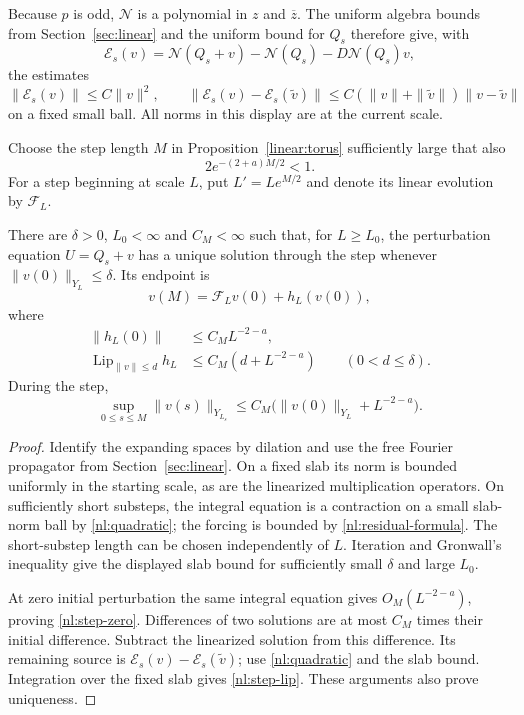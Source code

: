 Because $p$ is odd, $\mathcal N$ is a polynomial in $z$ and $\overline z$.
The uniform algebra bounds from Section~\ref{sec:linear} and the uniform
bound for $Q_s$ therefore give, with
\[
 \mathcal E_s(v)=\mathcal N(Q_s+v)-\mathcal N(Q_s)
                    -D\mathcal N(Q_s)v,
\]
the estimates
\begin{equation}\label{nl:quadratic}
 \|\mathcal E_s(v)\|\leq C\|v\|^2,
 \qquad
 \|\mathcal E_s(v)-\mathcal E_s(\widetilde v)\|
 \leq C(\|v\|+\|\widetilde v\|)\|v-\widetilde v\|
\end{equation}
on a fixed small ball. All norms in this display are at the current scale.

Choose the step length $M$ in Proposition~\ref{linear:torus} sufficiently
large that also
\begin{equation}\label{nl:step-condition}
 2e^{-(2+a)M/2}<1.
\end{equation}
For a step beginning at scale $L$, put $L'=Le^{M/2}$ and denote its linear
evolution by $\mathcal F_L$.

\begin{lemma}\label{nl:step}
There are $\delta>0$, $L_0<\infty$ and $C_M<\infty$ such that, for
$L\geq L_0$, the perturbation equation $U=Q_s+v$ has a unique solution
through the step whenever $\|v(0)\|_{Y_L}\leq\delta$. Its endpoint is
\[
 v(M)=\mathcal F_Lv(0)+h_L(v(0)),
\]
where
\begin{align}
 \|h_L(0)\|&\leq C_M L^{-2-a},\label{nl:step-zero}\\
 \operatorname{Lip}_{\|v\|\leq d}h_L
   &\leq C_M(d+L^{-2-a})\qquad(0<d\leq\delta).
 \label{nl:step-lip}
\end{align}
During the step,
\[
 \sup_{0\leq s\leq M}\|v(s)\|_{Y_{L_s}}
 \leq C_M\bigl(\|v(0)\|_{Y_L}+L^{-2-a}\bigr).
\]
\end{lemma}

\begin{proof}
Identify the expanding spaces by dilation and use the free Fourier
propagator from Section~\ref{sec:linear}. On a fixed slab its norm is
bounded uniformly in the starting scale, as are the linearized
multiplication operators. On sufficiently short substeps, the integral
equation is a contraction on a small slab-norm ball by
\eqref{nl:quadratic}; the forcing is bounded by
\eqref{nl:residual-formula}. The short-substep length can be chosen
independently of $L$. Iteration and Gronwall's inequality give the displayed
slab bound for sufficiently small $\delta$ and large $L_0$.

At zero initial perturbation the same integral equation gives
$O_M(L^{-2-a})$, proving \eqref{nl:step-zero}. Differences of two
solutions are at most $C_M$ times their initial difference. Subtract the
linearized solution from this difference. Its remaining source is
$\mathcal E_s(v)-\mathcal E_s(\widetilde v)$; use
\eqref{nl:quadratic} and the slab bound. Integration over the fixed slab
gives \eqref{nl:step-lip}. These arguments also prove uniqueness.
\end{proof}

